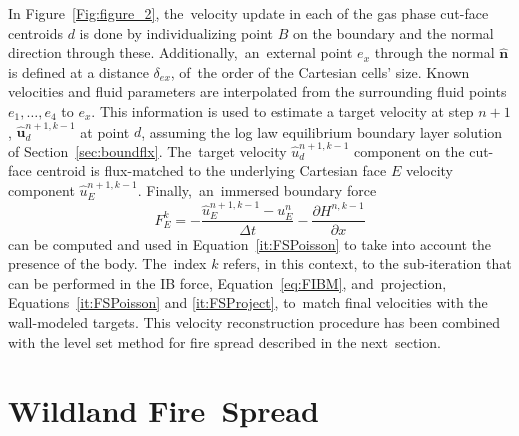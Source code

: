 \documentclass[atmosphere,article,accept,moreauthors,pdftex]{Definitions/mdpi}
\begin{document}
\begin{paracol}{2}
In Figure~\ref{Fig:figure_2}, the~velocity update in each of the gas phase cut-face centroids $d$ is done by individualizing point $B$ on the boundary and the normal direction through these. \mbox{Additionally, an~external} point $e_x$ through the normal $\mathbf{\hat{n}}$ is defined at a distance $\delta_{ex}$, of~the order of the Cartesian cells' size. Known velocities and fluid parameters are interpolated from the surrounding fluid points $e_1,\dots,e_4$ to $e_x$.
This information is used to estimate a target velocity at step $n+1$, $\mathbf{\hat{u}}_d^{n+1,k-1}$ at point $d$, assuming the log law equilibrium boundary layer solution of Section~\ref{sec:boundflx}. The~target velocity $\hat{u}_d^{n+1,k-1}$ component on the cut-face centroid is flux-matched to the underlying Cartesian face $E$ velocity component $\hat{u}_E^{n+1,k-1}$. \mbox{Finally, an~immersed} boundary force
\begin{equation}
F_E^k=-\frac{\hat{u}_E^{n+1,k-1}-u_E^{n}}{\Delta t} - \frac{\partial H^{n,k-1}}{\partial x}
\label{eq:FIBM}
\end{equation}
can be computed and used in Equation~\eqref{it:FSPoisson} to take into account the presence of the body. The~index $k$ refers, in this context, to the sub-iteration that can be performed in the IB force, Equation~\eqref{eq:FIBM}, and~projection, Equations~\eqref{it:FSPoisson} and \eqref{it:FSProject}, to~match final velocities with the wall-modeled targets. This velocity reconstruction procedure has been combined with the level set method for fire spread described in the next~section.


\section{Wildland Fire~Spread} \label{sec:firespread}


\end{paracol}
\end{document}
